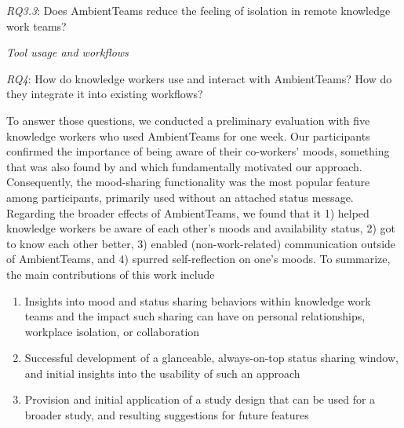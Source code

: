 \smallskip\noindent\textit{RQ3.3}: Does AmbientTeams reduce the feeling of isolation in remote knowledge work teams?

\setlength{\leftskip}{0pt}

\medskip\noindent\textit{Tool usage and workflows}

\smallskip\noindent\textit{RQ4}: How do knowledge workers use and interact with AmbientTeams? How do they integrate it into existing workflows?

\bigskip\noindent To answer those questions, we conducted a preliminary evaluation with five knowledge workers who used AmbientTeams for one week. Our participants confirmed the importance of being aware of their co-workers' moods, something that was also found by \textcite{garcia1999emotional, dullemond2013fixing} and which fundamentally motivated our approach. Consequently, the mood-sharing functionality was the most popular feature among participants, primarily used without an attached status message. Regarding the broader effects of AmbientTeams, we found that it 1) helped knowledge workers be aware of each other's moods and availability status, 2) got to know each other better, 3) enabled (non-work-related) communication outside of AmbientTeams, and 4) spurred self-reflection on one's moods. To summarize, the main contributions of this work include

\begin{enumerate}
    \item Insights into mood and status sharing behaviors within knowledge work teams and the impact such sharing can have on personal relationships, workplace isolation, or collaboration
    \item Successful development of a glanceable, always-on-top status sharing window, and initial insights into the usability of such an approach
    \item Provision and initial application of a study design that can be used for a broader study, and resulting suggestions for future features
\end{enumerate}
